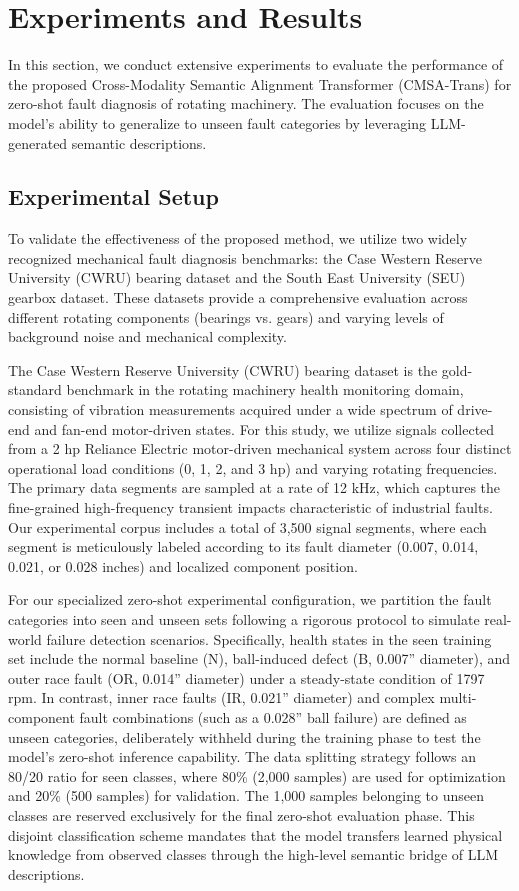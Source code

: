 \section{Experiments and Results}
In this section, we conduct extensive experiments to evaluate the performance of the proposed Cross-Modality Semantic Alignment Transformer (CMSA-Trans) for zero-shot fault diagnosis of rotating machinery. The evaluation focuses on the model's ability to generalize to unseen fault categories by leveraging LLM-generated semantic descriptions.

\subsection{Experimental Setup}
To validate the effectiveness of the proposed method, we utilize two widely recognized mechanical fault diagnosis benchmarks: the Case Western Reserve University (CWRU) bearing dataset and the South East University (SEU) gearbox dataset. These datasets provide a comprehensive evaluation across different rotating components (bearings vs. gears) and varying levels of background noise and mechanical complexity.

The Case Western Reserve University (CWRU) bearing dataset is the gold-standard benchmark in the rotating machinery health monitoring domain, consisting of vibration measurements acquired under a wide spectrum of drive-end and fan-end motor-driven states. For this study, we utilize signals collected from a 2 hp Reliance Electric motor-driven mechanical system across four distinct operational load conditions (0, 1, 2, and 3 hp) and varying rotating frequencies. The primary data segments are sampled at a rate of 12 kHz, which captures the fine-grained high-frequency transient impacts characteristic of industrial faults. Our experimental corpus includes a total of 3,500 signal segments, where each segment is meticulously labeled according to its fault diameter (0.007, 0.014, 0.021, or 0.028 inches) and localized component position. 

For our specialized zero-shot experimental configuration, we partition the fault categories into seen and unseen sets following a rigorous protocol to simulate real-world failure detection scenarios. Specifically, health states in the seen training set include the normal baseline (N), ball-induced defect (B, 0.007'' diameter), and outer race fault (OR, 0.014'' diameter) under a steady-state condition of 1797 rpm. In contrast, inner race faults (IR, 0.021'' diameter) and complex multi-component fault combinations (such as a 0.028'' ball failure) are defined as unseen categories, deliberately withheld during the training phase to test the model's zero-shot inference capability. The data splitting strategy follows an 80/20 ratio for seen classes, where 80\% (2,000 samples) are used for optimization and 20\% (500 samples) for validation. The 1,000 samples belonging to unseen classes are reserved exclusively for the final zero-shot evaluation phase. This disjoint classification scheme mandates that the model transfers learned physical knowledge from observed classes through the high-level semantic bridge of LLM descriptions.

